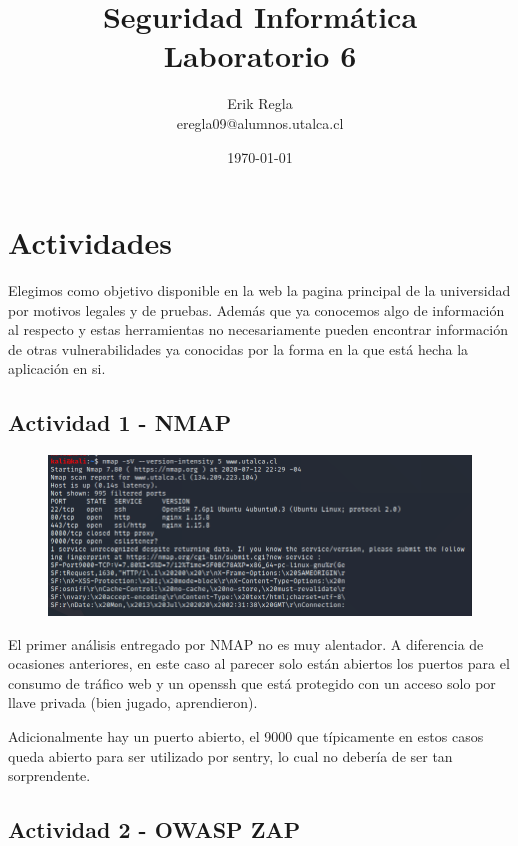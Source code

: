 \documentclass[11pt]{utalcaDoc}
\title{{\bf Seguridad Informática}\\ Laboratorio 6}
\author{Erik Regla\\ eregla09@alumnos.utalca.cl}
\date{\today}
\begin{document}
\maketitle
\newpage
\tableofcontents
\newpage

\section{Actividades}

Elegimos como objetivo disponible en la web la pagina principal de la universidad por motivos legales y de pruebas. Además que ya conocemos algo de información al respecto y estas herramientas no necesariamente pueden encontrar información de otras vulnerabilidades ya conocidas por la forma en la que está hecha la aplicación en si.


\subsection{Actividad 1 - NMAP}

\begin{figure}[H]
	\centering
	\centering\includegraphics[width=.75\textwidth]{images2/nmap.png}
\end{figure}

El primer análisis entregado por NMAP no es muy alentador. A diferencia de ocasiones anteriores, en este caso al parecer solo están abiertos los puertos para el consumo de tráfico web y un openssh que está protegido con un acceso solo por llave privada (bien jugado, aprendieron).

Adicionalmente hay un puerto abierto, el 9000 que típicamente en estos casos queda abierto para ser utilizado por sentry, lo cual no debería de ser tan sorprendente.


\subsection{Actividad 2 - OWASP ZAP}
\end{document}
